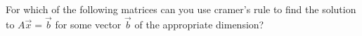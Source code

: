 \documentclass{ximera}
\begin{document}
        \begin{question} For which of the following matrices can you use cramer's rule to find the solution to $A\vec{x} = \vec{b}$ for some vector $\vec{b}$ of the appropriate dimension? 
        	
        	\begin{multipleChoice}
       	 \vspace{5pt}\\
       	\vspace{5pt}\\	
       	  		\end{multipleChoice}
       	  		
       	  		
       	  		
       	  	\end{question}	
\end{document}

